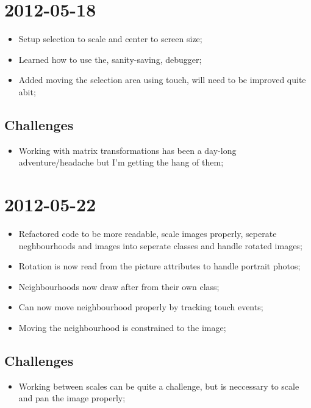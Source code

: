 \documentclass{report}
\begin{document}
\section*{2012-05-18}
\begin{itemize}
  \item
    Setup selection to scale and center to screen size;
  \item
    Learned how to use the, sanity-saving, debugger;
  \item
    Added moving the selection area using touch, will need to be improved quite abit;
\end{itemize}
\subsection*{Challenges}
\begin{itemize}
  \item
    Working with matrix transformations has been a day-long adventure/headache but I'm getting the hang of them;
\end{itemize}

\section*{2012-05-22}
\begin{itemize}
  \item 
    Refactored code to be more readable, scale images properly, seperate neghbourhoods and images into seperate classes and handle rotated images;
  \item
    Rotation is now read from the picture attributes to handle portrait photos;
  \item
    Neighbourhoods now draw after from their own class;
  \item
    Can now move neighbourhood properly by tracking touch events;
  \item
    Moving the neighbourhood is constrained to the image;
\end{itemize}
\subsection*{Challenges}
\begin{itemize}
  \item 
    Working between scales can be quite a challenge, but is neccessary to scale and pan the image properly;
\end{itemize}
\end{document}
